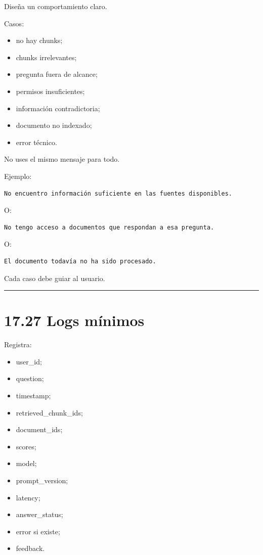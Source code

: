 Diseña un comportamiento claro.

Casos:

\begin{itemize}
\tightlist
\item
  no hay chunks;
\item
  chunks irrelevantes;
\item
  pregunta fuera de alcance;
\item
  permisos insuficientes;
\item
  información contradictoria;
\item
  documento no indexado;
\item
  error técnico.
\end{itemize}

No uses el mismo mensaje para todo.

Ejemplo:

\begin{lstlisting}
No encuentro información suficiente en las fuentes disponibles.
\end{lstlisting}

O:

\begin{lstlisting}
No tengo acceso a documentos que respondan a esa pregunta.
\end{lstlisting}

O:

\begin{lstlisting}
El documento todavía no ha sido procesado.
\end{lstlisting}

Cada caso debe guiar al usuario.

\begin{center}\rule{0.5\linewidth}{0.5pt}\end{center}

\section{17.27 Logs mínimos}\label{logs-muxednimos}

Registra:

\begin{itemize}
\tightlist
\item
  user\_id;
\item
  question;
\item
  timestamp;
\item
  retrieved\_chunk\_ids;
\item
  document\_ids;
\item
  scores;
\item
  model;
\item
  prompt\_version;
\item
  latency;
\item
  answer\_status;
\item
  error si existe;
\item
  feedback.
\end{itemize}

